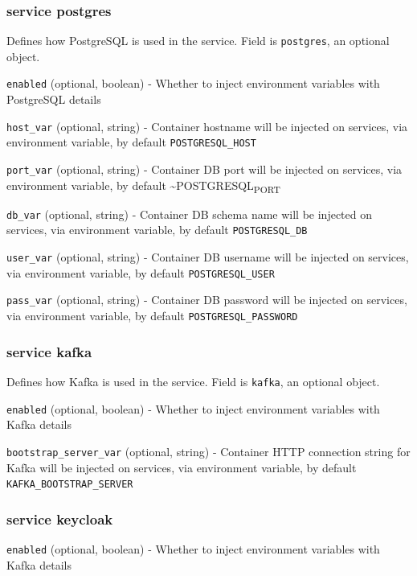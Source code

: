 \documentclass[11pt]{article}
\begin{document}
\subsubsection{service postgres}
\label{sec:orgcabcbd6}

Defines how PostgreSQL is used in the service. Field is \texttt{postgres}, an optional object.

\texttt{enabled} (optional, boolean) - Whether to inject environment variables with PostgreSQL details

\texttt{host\_var} (optional, string) - Container hostname will be injected on services, via environment variable, by default \texttt{POSTGRESQL\_HOST}

\texttt{port\_var} (optional, string) - Container DB port will be injected on services, via environment variable, by default \textasciitilde{}POSTGRESQL\textsubscript{PORT}

\texttt{db\_var} (optional, string) - Container DB schema name will be injected on services, via environment variable, by default \texttt{POSTGRESQL\_DB}

\texttt{user\_var} (optional, string) - Container DB username will be injected on services, via environment variable, by default \texttt{POSTGRESQL\_USER}

\texttt{pass\_var} (optional, string) - Container DB password will be injected on services, via environment variable, by default \texttt{POSTGRESQL\_PASSWORD}

\subsubsection{service kafka}
\label{sec:org2fb26dc}

Defines how Kafka is used in the service. Field is \texttt{kafka}, an optional object.

\texttt{enabled} (optional, boolean) - Whether to inject environment variables with Kafka details

\texttt{bootstrap\_server\_var} (optional, string) - Container HTTP connection string for Kafka will be injected on services, via environment variable, by default \texttt{KAFKA\_BOOTSTRAP\_SERVER}

\subsubsection{service keycloak}
\label{sec:orga41063c}

\texttt{enabled} (optional, boolean) - Whether to inject environment variables with Kafka details
\end{document}

